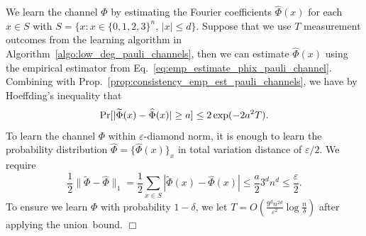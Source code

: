 \documentclass[11pt]{article}
\newcommand{\eps}{\varepsilon}
\theoremstyle{plain}
\renewcommand{\Pr}{\mbox{\rm Pr}}
\theoremstyle{plain}
\theoremstyle{definition}
\theoremstyle{remark}
\renewenvironment{proof}[1][]{
    \begin{trivlist}
    \item[\hspace{\labelsep}{\em\noindent Proof#1:\/}]}
    {{\hfill$\Box$}
    \end{trivlist}
}
\theoremstyle{named}
\begin{document}
\begin{proof}[ of~\cref{theo:learnPauliChannels}]
We learn the channel $\Phi$ by estimating the Fourier coefficients $\widehat{\Phi}(x)$ for each $x \in S$ with $S = \{x : x \in \{0,1,2,3\}^n, \, |x|\leq d\}$. Suppose that we use $T$ measurement outcomes from the learning algorithm in Algorithm~\ref{algo:low_deg_pauli_channels}, then we can estimate $\widehat{\Phi}(x)$ using the empirical estimator from Eq.~\ref{eq:emp_estimate_phix_pauli_channel}. Combining with Prop.~\ref{prop:consistency_emp_est_pauli_channels}, we have by Hoeffding's inequality that
\begin{equation}
    \Pr[|\widetilde{\Phi}(x) - \widehat{\Phi}(x)| \geq a] \leq 2 \exp(-2 a^2 T).
\end{equation}
To learn the channel $\Phi$ within $\eps$-diamond norm, it is enough to learn the probability distribution $\widehat{\Phi} = \{\widehat{\Phi}(x)\}_x$ in total variation distance of $\eps/2$. We require
\begin{equation}
    \frac{1}{2}\|\widetilde{\Phi} - \widehat{\Phi}\|_1 = \frac{1}{2} \sum_{x \in S} |\widetilde{\Phi}(x) - \widehat{\Phi}(x)| \leq \frac{a}{2} 3^d n^d \leq \frac{\eps}{2}.
\end{equation}
To ensure we learn $\Phi$ with probability $1 - \delta$, we let $T = O\left(\frac{9^d n^{2d}}{\eps^2}\log \frac{n}{\delta} \right)$ after applying the union~bound.
\end{proof}
\end{document}
